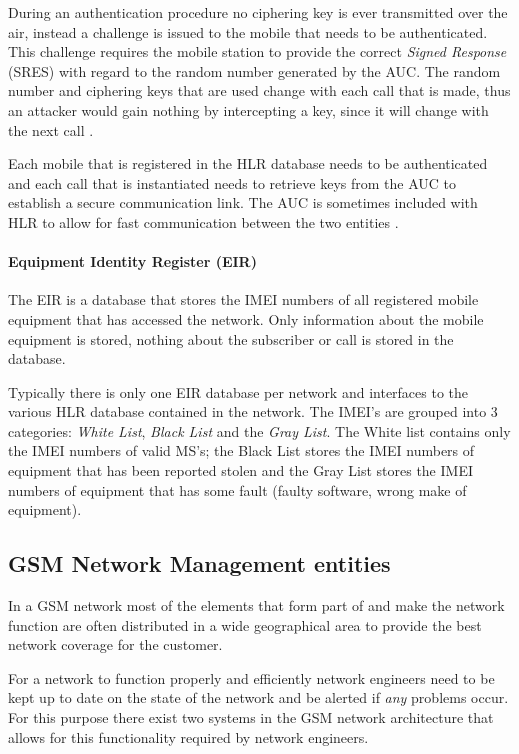 During an authentication procedure no ciphering key is ever transmitted over the air, instead a challenge is issued to the mobile that needs to be authenticated. This challenge requires the mobile station to provide the correct \emph{Signed Response} (SRES) with regard to the random number generated by the AUC\cite{GSM92,GSMSysEngin}. The random number and ciphering keys that are used change with each call that is made, thus an attacker would gain nothing by intercepting a key, since it will change with the next call \cite{GSMSysEngin}.

Each mobile that is registered in the HLR database needs to be authenticated and each call that is instantiated needs to retrieve keys from the AUC to establish a secure communication link\cite{GSM92,GSMSysEngin}. The AUC is sometimes included with HLR to allow for fast communication between the two entities \cite{GSMSysEngin}.

\paragraph{Equipment Identity Register (EIR)}
The EIR is a database that stores the IMEI numbers of all registered mobile equipment that has accessed the network. Only information about the mobile equipment is stored, nothing about the subscriber or call is stored in the database.

Typically there is only one EIR database per network and interfaces to the various HLR database contained in the network. The IMEI's are grouped into 3 categories: \emph{White List}, \emph{Black List} and the \emph{Gray List}. The White list contains only the IMEI numbers of valid MS's; the Black List stores the IMEI numbers of equipment that has been reported stolen and the Gray List stores the IMEI numbers of equipment that has some fault (faulty software, wrong make of equipment).

\subsection{GSM Network Management entities}
In a GSM network most of the elements that form part of and make the network function are often distributed in a wide geographical area to provide the best network coverage for the customer. 

For a network to function properly and efficiently network engineers need to be kept up to date on the state of the network and be alerted if \emph{any} problems occur. For this purpose there exist two systems in the GSM network architecture that allows for this functionality required by network engineers. 

